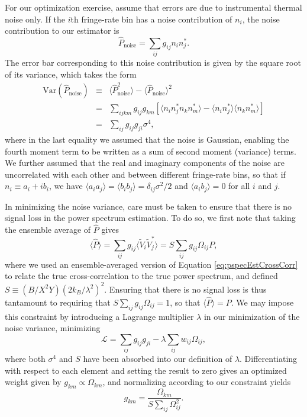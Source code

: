 \documentclass[twocolumn,apj,numberedappendix]{emulateapj}
\begin{document}
For our optimization exercise, assume that errors are due to instrumental thermal noise only. If the $i$th fringe-rate bin has a noise contribution of $n_i$, the noise contribution to our estimator is
\begin{equation}
\widehat{P}_\textrm{noise} = \sum_{ij} g_{ij} n_i n_j^*.
\end{equation}
The error bar corresponding to this noise contribution is given by the square root of its variance, which takes the form
\begin{eqnarray}
\label{eq:NoiseVar}
\textrm{Var}(\widehat{P}_\textrm{noise} ) &\equiv& \langle \widehat{P}_\textrm{noise}^2 \rangle - \langle \widehat{P}_\textrm{noise} \rangle^2 \nonumber \\
&= & \sum_{ijkm} g_{ij} g_{km} \left[ \langle n_i n_j^* n_k n_m^* \rangle - \langle n_i n_j^*\rangle \langle n_k n_m^* \rangle \right] \nonumber \\
&=&  \sum_{ij} g_{ij} g_{ji}\sigma^4,
\end{eqnarray}
where in the last equality we assumed that the noise is Gaussian, enabling the fourth moment term to be written as a sum of second moment (variance) terms. We further assumed that the real and imaginary components of the noise are uncorrelated with each other and between different fringe-rate bins, so that if $n_i \equiv a_i + i b_i$, we have $\langle a_i a_j \rangle = \langle b_i b_j \rangle = \delta_{ij} \sigma^2/2 $ and $\langle a_i b_j \rangle= 0$ for all $i$ and $j$.

In minimizing the noise variance, care must be taken to ensure that there is no signal loss in the power spectrum estimation. To do so, we first note that taking the ensemble average of $\widehat{P}$ gives
\begin{equation}
\langle \widehat{P} \rangle = \sum_{ij} g_{ij} \langle \widetilde{V}_i \widetilde{V}_j^* \rangle = S \sum_{ij} g_{ij} \Omega_{ij} P,
\end{equation}
where we used an ensemble-averaged version of Equation \eqref{eq:pspecEstCrossCorr} to relate the true cross-correlation to the true power spectrum, and defined $S \equiv ( B / X^2 Y) ( 2 k_B / \lambda^2 )^2$. Ensuring that there is no signal loss is thus tantamount to requiring that $ S \sum_{ij} g_{ij} \Omega_{ij} =1$, so that $\langle \widehat{P} \rangle = P$. We may impose this constraint by introducing a Lagrange multiplier $\lambda$ in our minimization of the noise variance, minimizing
\begin{equation}
\mathcal L = \sum_{ij} g_{ij} g_{ji} - \lambda \sum_{ij} w_{ij} \Omega_{ij},
\end{equation}
where both $\sigma^4$ and $S$ have been absorbed into our definition of $\lambda$. Differentiating with respect to each element and setting the result to zero gives an optimized weight given by $g_{km} \propto \Omega_{km}$, and normalizing according to our constraint yields
\begin{equation}
\label{eq:PspecOptWeights}
g_{km} = \frac{\Omega_{km}}{S \sum_{ij} \Omega_{ij}^2}.
\end{equation}
\end{document}
